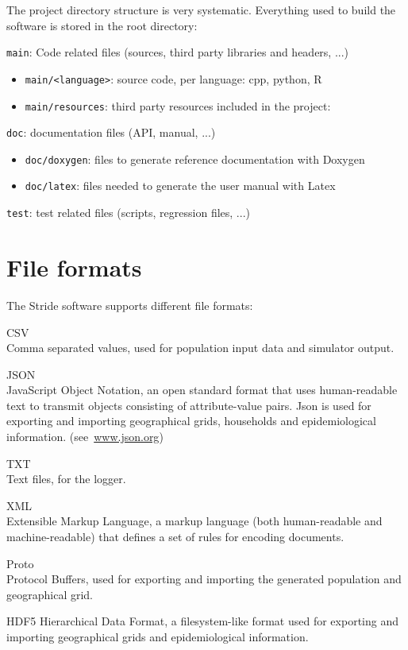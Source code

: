The project directory structure is very systematic.
Everything used to build the software is stored in the root directory:
\begin{compactitem}
    \item \texttt{main}: Code related files (sources, third party libraries and headers, ...)
      	\begin{itemize}
        		\item \texttt{main/<language>}: source code, per language: cpp, python, R
        		\item \texttt{main/resources}: third party resources included in the project:
        \end{itemize}
    \item \texttt{doc}: documentation files (API, manual, ...)
      	\begin{itemize}
        		\item \texttt{doc/doxygen}: files to generate reference documentation with Doxygen
        		\item \texttt{doc/latex}: files needed to generate the user manual with Latex
        \end{itemize}
    \item \texttt{test}: test related files (scripts, regression files, ...)
\end{compactitem}

\section{File formats}
\label{section:FileFormats}

The Stride software supports different file formats:
\begin{compactdesc}
	\item [CSV] \ \\
	Comma separated values, used for population input data and simulator output.
	\item [JSON] \ \\
	JavaScript Object Notation, an open standard format that uses human-readable text to transmit objects consisting of attribute-value pairs. Json is used for exporting and importing geographical grids, households and epidemiological information.	 \mbox{(see \url{www.json.org})}
	\item [TXT] \ \\
	Text files, for the logger.
	\item [XML] \ \\
	Extensible Markup Language, a markup language (both human-readable and machine-readable) that defines a set of rules for encoding documents.
    \item [Proto] \ \\
    Protocol Buffers, used for exporting and importing the generated population and geographical grid.
    \item [HDF5]
    Hierarchical Data Format, a filesystem-like format used for exporting and importing geographical grids and epidemiological information.
\end{compactdesc}


